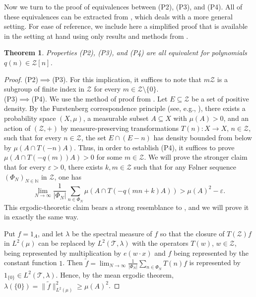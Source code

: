 \documentclass[11pt]{amsart}
\theoremstyle{theorem}
\newtheorem{theorem}{Theorem}[section]
\theoremstyle{definition}
\newcommand{\N}{\mathbb{N}}
\newcommand{\mZ}{\mathcal{Z}}
\newcommand{\mT}{\mathcal{T}}
\newcommand{\eps}{\varepsilon}
\renewcommand{\tilde}{\widetilde}
\begin{document}
Now we turn to the proof of equivalences between (P2), (P3), and (P4).
All of these equivalences can be extracted from \cite[Theorem 4.13]{ab_rings}, which deals with a more general setting.
For ease of reference, we include here a simplified proof that is available in the setting at hand using only results and methods from \cite{bl}.

\begin{theorem} \label{thm: equivalences}
	Properties (P2), (P3), and (P4) are all equivalent for polynomials $q(n) \in \mZ[n]$.
\end{theorem}

\begin{proof}
	(P2)$\implies$(P3).
	For this implication, it suffices to note that $m\mZ$ is a subgroup of finite index in $\mZ$ for every $m \in \mZ \setminus \{0\}$. \\
	
	(P3)$\implies$(P4).
	We use the method of proof from \cite[Section 9]{bl}.
	Let $E \subseteq \mZ$ be a set of positive density.
	By the Furstenberg correspondence principle (see, e.g., \cite[Theorem 4.17]{etdp}), there exists a probability space $(X, \mu)$, a measurable subset $A \subseteq X$ with $\mu(A) > 0$, and an action of $(\mZ,+)$ by measure-preserving transformations $T(n) : X \to X$, $n \in \mZ$, such that for every $n \in \mZ$, the set $E \cap (E - n)$ has density bounded from below by $\mu(A \cap T(-n)A)$.
	Thus, in order to establish (P4), it suffices to prove $\mu(A \cap T(-q(m))A) > 0$ for some $m \in \mZ$.
	We will prove the stronger claim that for every $\eps > 0$, there exists $k, m \in \mZ$ such that for any F{\o}lner sequence $(\Phi_N)_{N \in \N}$ in $\mZ$, one has
	\begin{equation*}
		\lim_{N \to \infty} \frac{1}{|\Phi_N|} \sum_{n \in \Phi_N} \mu(A \cap T(-q(mn+k)A)) > \mu(A)^2 - \eps.
	\end{equation*}
	This ergodic-theoretic claim bears a strong resemblance to \cite[Theorem 9.3]{bl}, and we will prove it in exactly the same way.
	
    Put $f = 1_A$, and let $\lambda$ be the spectral measure of $f$ so that the closure of $T(\mZ)f$ in $L^2(\mu)$ can be replaced by $L^2(\mT,\lambda)$ with the operators $T(w)$, $w \in \mZ$, being represented by multiplication by $e(w \cdot x)$ and $f$ being represented by the constant function $1$.
	Then $\tilde{f} = \lim_{N \to \infty} \frac{1}{|\Phi_N|} \sum_{n \in \Phi_N} T(n)f$ is represented by $1_{\{0\}} \in L^2(\mT,\lambda)$.
	Hence, by the mean ergodic theorem, $\lambda(\{0\}) = \|\tilde{f}\|_{L^2(\mu)}^2 \ge \mu(A)^2$.
	

\end{proof}
\end{document}
